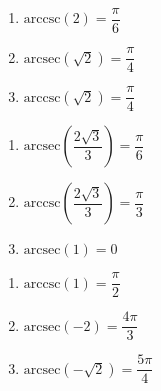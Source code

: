 \begin{multicols}{3} 

\begin{enumerate}

\setcounter{enumi}{\value{HW}}

\item $\mbox{arccsc} \left( 2 \right) = \dfrac{\pi}{6}$
\item $\mbox{arcsec} \left( \sqrt{2} \right) = \dfrac{\pi}{4}$
\item $\mbox{arccsc} \left( \sqrt{2} \right) = \dfrac{\pi}{4}$

\setcounter{HW}{\value{enumi}}

\end{enumerate}

\end{multicols}

\begin{multicols}{3} 

\begin{enumerate}

\setcounter{enumi}{\value{HW}}

\item $\mbox{arcsec} \left( \dfrac{2\sqrt{3}}{3} \right) = \dfrac{\pi}{6}$
\item $\mbox{arccsc} \left( \dfrac{2\sqrt{3}}{3} \right) = \dfrac{\pi}{3}$
\item $\mbox{arcsec} \left( 1 \right) = 0$ 

\setcounter{HW}{\value{enumi}}

\end{enumerate}

\end{multicols}

\begin{multicols}{3} 

\begin{enumerate}

\setcounter{enumi}{\value{HW}}

\item $\mbox{arccsc} \left( 1 \right) = \dfrac{\pi}{2}$ 
\item $\mbox{arcsec} \left( -2 \right) = \dfrac{4\pi}{3}$
\item $\mbox{arcsec} \left( -\sqrt{2} \right) = \dfrac{5\pi}{4}$

\setcounter{HW}{\value{enumi}}

\end{enumerate}

\end{multicols}

